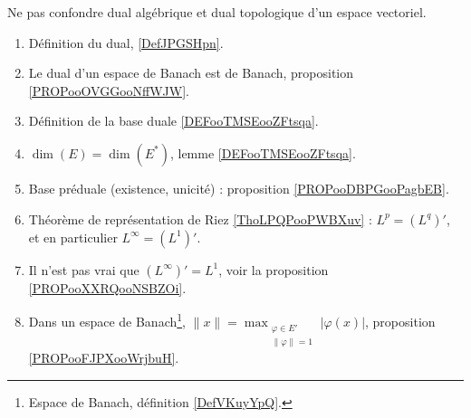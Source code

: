      \label{THEMEooULGFooPscFJC}

Ne pas confondre dual algébrique et dual topologique d'un espace vectoriel.

\begin{enumerate}
	\item
	      Définition du dual, \ref{DefJPGSHpn}.
	\item
	      Le dual d'un espace de Banach est de Banach, proposition \ref{PROPooOVGGooNffWJW}.
	\item
	      Définition de la base duale \ref{DEFooTMSEooZFtsqa}.
	\item
	      \( \dim(E)=\dim(E^*)\), lemme \ref{DEFooTMSEooZFtsqa}.
	\item
	      Base préduale (existence, unicité) : proposition \ref{PROPooDBPGooPagbEB}.
	\item
	      Théorème de représentation de Riez \ref{ThoLPQPooPWBXuv} : \( L^p=(L^q)'\), et en particulier \( L^{\infty}=(L^1)'\).
	\item
	      Il n'est pas vrai que \( (L^{\infty})'=L^1\), voir la proposition \ref{PROPooXXRQooNSBZOi}.
	\item
	      Dans un espace de Banach\footnote{Espace de Banach, définition \ref{DefVKuyYpQ}.}, \( \| x \|=\max_{\substack{\varphi\in E'\\\| \varphi \|=1}}| \varphi(x) |\), proposition \ref{PROPooFJPXooWrjbuH}.
\end{enumerate}

